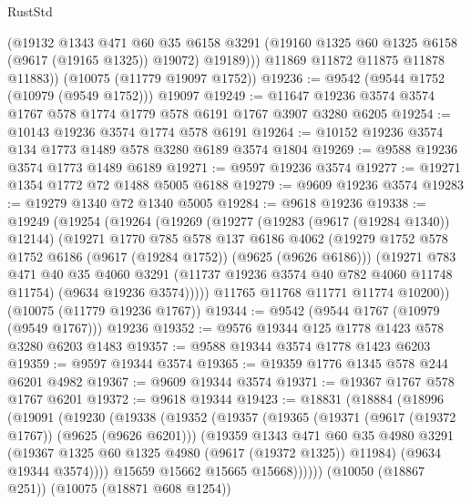 \begin{lexlean}{RustStd}
\begin{coremodule}
            (@19132
              @1343
              @471
              @60
              @35
              @6158
              @3291
              (@19160 @1325 @60 @1325 @6158 (@9617 (@19165 @1325)) @19072)
              @19189)))
        @11869
        @11872
        @11875
        @11878
        @11883))
    (@10075 (@11779 @19097 @1752))
@19236 := @9542 (@9544 @1752 (@10979 (@9549 @1752))) @19097
@19249 := @11647 @19236 @3574 @3574 @1767 @578 @1774 @1779 @578 @6191 @1767 @3907 @3280 @6205
@19254 := @10143 @19236 @3574 @1774 @578 @6191
@19264 := @10152 @19236 @3574 @134 @1773 @1489 @578 @3280 @6189 @3574 @1804
@19269 := @9588 @19236 @3574 @1773 @1489 @6189
@19271 := @9597 @19236 @3574
@19277 := @19271 @1354 @1772 @72 @1488 @5005 @6188
@19279 := @9609 @19236 @3574
@19283 := @19279 @1340 @72 @1340 @5005
@19284 := @9618 @19236
@19338 := @19249
    (@19254
      (@19264
        (@19269
          (@19277
            (@19283 (@9617 (@19284 @1340)) @12144)
            (@19271
              @1770
              @785
              @578
              @137
              @6186
              @4062
              (@19279 @1752 @578 @1752 @6186 (@9617 (@19284 @1752)) (@9625 (@9626 @6186)))
              (@19271
                @783
                @471
                @40
                @35
                @4060
                @3291
                (@11737 @19236 @3574 @40 @782 @4060 @11748 @11754)
                (@9634 @19236 @3574)))))
        @11765
        @11768
        @11771
        @11774
        @10200))
    (@10075 (@11779 @19236 @1767))
@19344 := @9542 (@9544 @1767 (@10979 (@9549 @1767))) @19236
@19352 := @9576 @19344 @125 @1778 @1423 @578 @3280 @6203 @1483
@19357 := @9588 @19344 @3574 @1778 @1423 @6203
@19359 := @9597 @19344 @3574
@19365 := @19359 @1776 @1345 @578 @244 @6201 @4982
@19367 := @9609 @19344 @3574
@19371 := @19367 @1767 @578 @1767 @6201
@19372 := @9618 @19344
@19423 := @18831
    (@18884
      (@18996
        (@19091
          (@19230
            (@19338
              (@19352
                (@19357
                  (@19365
                    (@19371 (@9617 (@19372 @1767)) (@9625 (@9626 @6201)))
                    (@19359
                      @1343
                      @471
                      @60
                      @35
                      @4980
                      @3291
                      (@19367 @1325 @60 @1325 @4980 (@9617 (@19372 @1325)) @11984)
                      (@9634 @19344 @3574))))
                @15659
                @15662
                @15665
                @15668))))))
    (@10050 (@18867 @251))
    (@10075 (@18871 @608 @1254))

\end{coremodule}
\end{lexlean}
